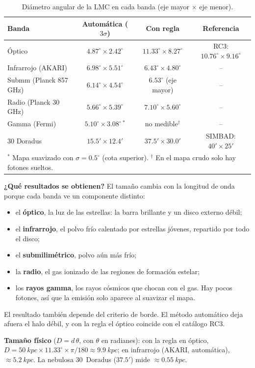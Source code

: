 \documentclass[11pt,a4paper]{article}
\begin{document}
\begin{table}[H]
\centering
\caption{Diámetro angular de la LMC en cada banda (eje mayor $\times$ eje menor).}
\small
\begin{tabular}{lccc}
\toprule
Banda & Automática ($3\sigma$) & Con regla & Referencia \\
\midrule
Óptico & $4.87^\circ \times 2.42^\circ$ & $11.33^\circ \times 8.27^\circ$ & RC3: $10.76^\circ \times 9.16^\circ$ \\
Infrarrojo (AKARI) & $6.98^\circ \times 5.51^\circ$ & $6.43^\circ \times 4.80^\circ$ & -- \\
Submm (Planck 857 GHz) & $6.14^\circ \times 4.54^\circ$ & $6.53^\circ$ (eje mayor) & -- \\
Radio (Planck 30 GHz) & $5.66^\circ \times 5.39^\circ$ & $7.10^\circ \times 5.60^\circ$ & -- \\
Gamma (Fermi) & $5.10^\circ \times 3.08^\circ$\,$^*$ & no medible$^\dagger$ & -- \\
30 Doradus & $15.5' \times 12.4'$ & $37.5' \times 30.0'$ & SIMBAD: $40' \times 25'$ \\
\bottomrule
\multicolumn{4}{l}{\footnotesize $^*$ Mapa suavizado con $\sigma = 0.5^\circ$ (cota superior). $^\dagger$ En el mapa crudo solo hay fotones sueltos.}
\end{tabular}
\end{table}

\textbf{¿Qué resultados se obtienen?} El tamaño cambia con la longitud de onda porque cada banda ve un
componente distinto:
\begin{itemize}
  \item el \textbf{óptico}, la luz de las estrellas: la barra brillante y un disco externo débil;
  \item el \textbf{infrarrojo}, el polvo frío calentado por estrellas jóvenes, repartido por todo el disco;
  \item el \textbf{submilimétrico}, polvo aún más frío;
  \item la \textbf{radio}, el gas ionizado de las regiones de formación estelar;
  \item los \textbf{rayos gamma}, los rayos cósmicos que chocan con el gas. Hay pocos fotones, así que la
  emisión solo aparece al suavizar el mapa.
\end{itemize}
El resultado también depende del criterio de borde. El método automático deja afuera el halo débil, y
con la regla el óptico coincide con el catálogo RC3.

\textbf{Tamaño físico} ($D = d\,\theta$, con $\theta$ en radianes): con la regla en óptico,
$D = \SI{50}{kpc} \times 11.33^\circ \times \pi/180 \approx \SI{9.9}{kpc}$; en infrarrojo (AKARI,
automática), $\approx \SI{5.2}{kpc}$. La nebulosa 30~Doradus ($37.5'$) mide $\approx \SI{0.55}{kpc}$.
\end{document}
